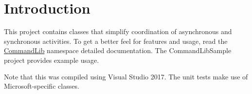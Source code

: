 \hypertarget{index_intro_sec}{}\section{Introduction}\label{index_intro_sec}
This project contains classes that simplify coordination of asynchronous and synchronous activities. To get a better feel for features and usage, read the \mbox{\hyperlink{namespace_command_lib}{Command\+Lib}} namespace detailed documentation. The Command\+Lib\+Sample project provides example usage.

Note that this was compiled using Visual Studio 2017. The unit tests make use of Microsoft-\/specific classes. 